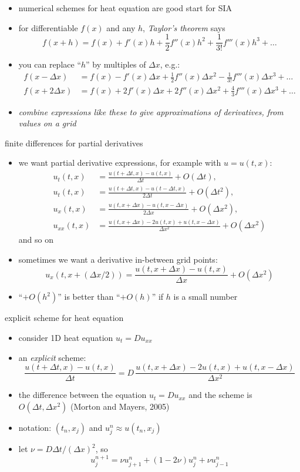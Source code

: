 \documentclass[titlepage,letterpaper,final,12pt]{scrartcl}
\begin{document}
\begin{itemize}
\item numerical schemes for heat equation are good start for SIA
\item for differentiable $f(x)$ and any $h$, \emph{Taylor's theorem} says
	$$f(x+h) = f(x) + f'(x) h + \frac{1}{2} f''(x) h^2 + \frac{1}{3!} f'''(x) h^3 + \dots$$
\item you can replace ``$h$'' by multiples of $\Delta x$, e.g.:
\begin{align*}
f(x-\Delta x) &= f(x) - f'(x) \Delta x + \frac{1}{2} f''(x) \Delta x^2 - \frac{1}{3!} f'''(x) \Delta x^3 + \dots \\
f(x+2\Delta x) &= f(x) + 2 f'(x) \Delta x + 2 f''(x) \Delta x^2 + \frac{4}{3} f'''(x) \Delta x^3 + \dots
\end{align*}
\item \emph{combine expressions like these to give approximations of derivatives, from values on a grid}
\end{itemize}

finite differences for partial derivatives

\begin{itemize}
\item we want partial derivative expressions, for example with $u=u(t,x)$:
\begin{align*}
u_t(t,x) &= \frac{u(t+\Delta t,x) - u(t,x)}{\Delta t} + O(\Delta t), \\
u_t(t,x) &= \frac{u(t+\Delta t,x) - u(t-\Delta t,x)}{2\Delta t} + O(\Delta t^2), \\
u_x(t,x) &= \frac{u(t,x+\Delta x) - u(t,x-\Delta x)}{2\Delta x} + O(\Delta x^2), \\
u_{xx}(t,x) &= \frac{u(t,x+\Delta x) - 2 u(t,x) + u(t,x-\Delta x)}{\Delta x^2} + O(\Delta x^2)
\end{align*}
and so on
\item sometimes we want a derivative in-between grid points:
	$$u_x(t,x+(\Delta x/2)) = \frac{u(t,x+\Delta x) - u(t,x)}{\Delta x} + O(\Delta x^2)$$
\item ``$+O(h^2)$'' is better than ``$+O(h)$'' if $h$ is a small number
\end{itemize}

explicit scheme for heat equation

\begin{itemize}
\item consider 1D heat equation $u_t = D u_{xx}$
\item an \emph{explicit} scheme:
	$$\frac{u(t+\Delta t,x) - u(t,x)}{\Delta t} = D\,\frac{u(t,x+\Delta x) - 2 u(t,x) + u(t,x-\Delta x)}{\Delta x^2}$$
\item the difference between the equation $u_t = D u_{xx}$ and the scheme is $O(\Delta t,\Delta x^2)$ (Morton and Mayers, 2005)\nocite{MortonMayers}
\item notation: $(t_n,x_j)$ and $u_j^n \approx u(t_n,x_j)$
\item let $\nu = D \Delta t / (\Delta x)^2$, so
	$$u_j^{n+1} = \nu u_{j+1}^n + (1 - 2 \nu) u_j^n + \nu u_{j-1}^n$$
\end{itemize}
\end{document}
